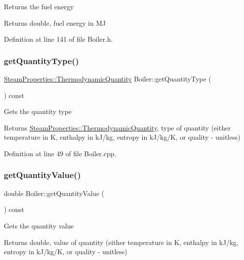 Returns the fuel energy \begin{DoxyReturn}{Returns}
double, fuel energy in MJ 
\end{DoxyReturn}


Definition at line 141 of file Boiler.\+h.

\mbox{\label{class_boiler_a26a71f789c9f9e05bd43a1ca0219f920}} 
\subsubsection{\texorpdfstring{get\+Quantity\+Type()}{getQuantityType()}}
{\footnotesize\ttfamily \hyperlink{class_steam_properties_ae0294bedf7d178c2d8fb6aed0f62fbff}{Steam\+Properties\+::\+Thermodynamic\+Quantity} Boiler\+::get\+Quantity\+Type (\begin{DoxyParamCaption}{ }\end{DoxyParamCaption}) const}

Gets the quantity type \begin{DoxyReturn}{Returns}
\hyperlink{class_steam_properties_ae0294bedf7d178c2d8fb6aed0f62fbff}{Steam\+Properties\+::\+Thermodynamic\+Quantity}, type of quantity (either temperature in K, enthalpy in k\+J/kg, entropy in k\+J/kg/K, or quality -\/ unitless) 
\end{DoxyReturn}


Definition at line 49 of file Boiler.\+cpp.

\mbox{\label{class_boiler_a78370a174135e6cc95abcd3b7ac2f947}} 
\subsubsection{\texorpdfstring{get\+Quantity\+Value()}{getQuantityValue()}}
{\footnotesize\ttfamily double Boiler\+::get\+Quantity\+Value (\begin{DoxyParamCaption}{ }\end{DoxyParamCaption}) const}

Gets the quantity value \begin{DoxyReturn}{Returns}
double, value of quantity (either temperature in K, enthalpy in k\+J/kg, entropy in k\+J/kg/K, or quality -\/ unitless) 
\end{DoxyReturn}


